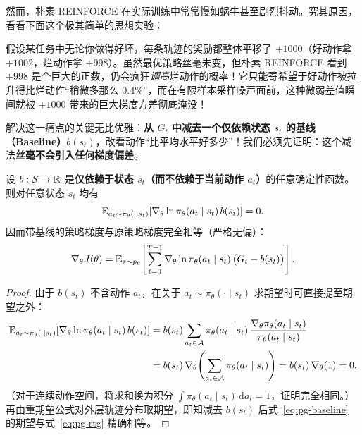 然而，朴素 REINFORCE 在实际训练中常常慢如蜗牛甚至剧烈抖动。究其原因，看看下面这个极其简单的思想实验：

假设某任务中无论你做得好坏，每条轨迹的奖励都整体平移了 $+1000$（好动作拿 $+1002$，烂动作拿 $+998$）。虽然最优策略丝毫未变，但朴素 REINFORCE 看到 $+998$ 是个巨大的正数，仍会疯狂\emph{调高}烂动作的概率！它只能寄希望于好动作被拉升得比烂动作“稍微多那么 $0.4\%$”，而在有限样本采样噪声面前，这种微弱差值瞬间就被 $+1000$ 带来的巨大梯度方差彻底淹没！

解决这一痛点的关键无比优雅：\textbf{从 $G_t$ 中减去一个仅依赖状态 $s_t$ 的基线（Baseline）$b(s_t)$}，改看动作“比平均水平好多少”！我们必须先证明：这个减法\textbf{丝毫不会引入任何梯度偏差}。

\begin{thmBox}
\begin{theorem}
\label{thm:baseline-unbiased}
设 $b: \mathcal{S} \to \mathbb{R}$ 是\textbf{仅依赖于状态 $s_t$（而不依赖于当前动作 $a_t$）}的任意确定性函数。则对任意状态 $s_t$ 均有
\begin{equation}
  \mathbb{E}_{a_t \sim \pi_\theta(\cdot \mid s_t)}\!\left[\nabla_\theta \ln \pi_\theta(a_t \mid s_t)\, b(s_t)\right] = 0.
  \label{eq:baseline-zero}
\end{equation}
因而带基线的策略梯度与原策略梯度完全相等（严格无偏）：
\begin{equation}
  \nabla_\theta J(\theta)
  = \mathbb{E}_{\tau \sim p_\theta}\!\left[\sum_{t=0}^{T-1} \nabla_\theta \ln \pi_\theta(a_t \mid s_t)\,\big(G_t - b(s_t)\big)\right].
  \label{eq:pg-baseline}
\end{equation}
\end{theorem}
\begin{proof}
由于 $b(s_t)$ 不含动作 $a_t$，在关于 $a_t \sim \pi_\theta(\cdot \mid s_t)$ 求期望时可直接提至期望之外：
\begin{align*}
  \mathbb{E}_{a_t \sim \pi_\theta(\cdot \mid s_t)}\!\left[\nabla_\theta \ln \pi_\theta(a_t \mid s_t)\, b(s_t)\right]
  &= b(s_t) \sum_{a_t \in \mathcal{A}} \pi_\theta(a_t \mid s_t)\, \frac{\nabla_\theta \pi_\theta(a_t \mid s_t)}{\pi_\theta(a_t \mid s_t)} \\
  &= b(s_t)\, \nabla_\theta \!\left(\sum_{a_t \in \mathcal{A}} \pi_\theta(a_t \mid s_t)\right)
   = b(s_t)\, \nabla_\theta(1) = 0.
\end{align*}
（对于连续动作空间，将求和换为积分 $\int \pi_\theta(a_t\mid s_t)\,\mathrm{d}a_t = 1$，证明完全相同。）再由重期望公式对外层轨迹分布取期望，即知减去 $b(s_t)$ 后式~\eqref{eq:pg-baseline} 的期望与式~\eqref{eq:pg-rtg} 精确相等。
\end{proof}
\end{thmBox}

